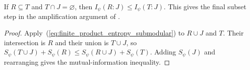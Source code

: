 \begin{theorem}
    \label{thm:finite_product_information_discarding}
    \leanok
    If $R\subseteq T$ and $T\cap J=\varnothing$, then
    $I_\psi(R:J)\le I_\psi(T:J)$.
    This gives the final subset step in the amplification argument of
    \cite[Section~10]{OpenAI2026AreaLaw}.
\end{theorem}
\begin{proof}\leanok
    Apply~(\ref{eq:finite_product_entropy_submodular}) to $R\cup J$ and
    $T$. Their intersection is $R$ and their union is $T\cup J$, so
    $S_\psi(T\cup J)+S_\psi(R)\le S_\psi(R\cup J)+S_\psi(T)$.
    Adding $S_\psi(J)$ and rearranging gives the mutual-information
    inequality.
\end{proof}
